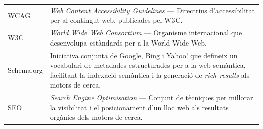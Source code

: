 \begin{longtable}{p{3.2cm}p{10cm}}
    WCAG     & \textit{Web Content Accessibility Guidelines} --- Directrius d'accessibilitat per al contingut web, publicades pel W3C. \\[4pt]
    W3C      & \textit{World Wide Web Consortium} --- Organisme internacional que desenvolupa estàndards per a la World Wide Web. \\[4pt]
    Schema.org & Iniciativa conjunta de Google, Bing i Yahoo! que defineix un vocabulari de metadades estructurades per a la web semàntica, facilitant la indexació semàntica i la generació de \textit{rich results} als motors de cerca. \\[4pt]
    SEO      & \textit{Search Engine Optimisation} --- Conjunt de tècniques per millorar la visibilitat i el posicionament d'un lloc web als resultats orgànics dels motors de cerca. \\[4pt]
    \bottomrule
\end{longtable}
